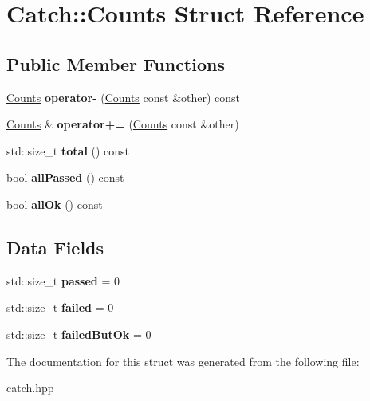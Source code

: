 \hypertarget{structCatch_1_1Counts}{}\section{Catch\+:\+:Counts Struct Reference}
\label{structCatch_1_1Counts}
\subsection*{Public Member Functions}
\begin{DoxyCompactItemize}
\item 
\mbox{\label{structCatch_1_1Counts_aaa10666f559057e3e860d2a5a6fae4c4}} 
\hyperlink{structCatch_1_1Counts}{Counts} {\bfseries operator-\/} (\hyperlink{structCatch_1_1Counts}{Counts} const \&other) const
\item 
\mbox{\label{structCatch_1_1Counts_a322a89475cd2cc039140ef371e973677}} 
\hyperlink{structCatch_1_1Counts}{Counts} \& {\bfseries operator+=} (\hyperlink{structCatch_1_1Counts}{Counts} const \&other)
\item 
\mbox{\label{structCatch_1_1Counts_a94f969c09cf52d1339c085c9603cd1d3}} 
std\+::size\+\_\+t {\bfseries total} () const
\item 
\mbox{\label{structCatch_1_1Counts_a84999490e0ecaa3de5e121bf48eda1b3}} 
bool {\bfseries all\+Passed} () const
\item 
\mbox{\label{structCatch_1_1Counts_a33bd996e016030155b99fe1c51c08991}} 
bool {\bfseries all\+Ok} () const
\end{DoxyCompactItemize}
\subsection*{Data Fields}
\begin{DoxyCompactItemize}
\item 
\mbox{\label{structCatch_1_1Counts_ad28daaf3de28006400208b6dd0c631e6}} 
std\+::size\+\_\+t {\bfseries passed} = 0
\item 
\mbox{\label{structCatch_1_1Counts_a19982a3817a3bc2c07f0290e71f497a3}} 
std\+::size\+\_\+t {\bfseries failed} = 0
\item 
\mbox{\label{structCatch_1_1Counts_ac090973a2ff51394cd452718e75c073e}} 
std\+::size\+\_\+t {\bfseries failed\+But\+Ok} = 0
\end{DoxyCompactItemize}


The documentation for this struct was generated from the following file\+:\begin{DoxyCompactItemize}
\item 
catch.\+hpp\end{DoxyCompactItemize}

